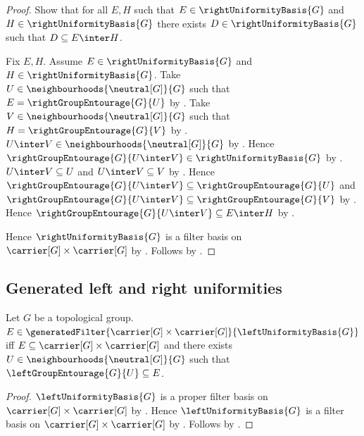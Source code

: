 \begin{proof}
    Show that for all $E,H$ such that
        $E\in\rightUniformityBasis{G}$ and
        $H\in\rightUniformityBasis{G}$ there exists
        $D\in\rightUniformityBasis{G}$ such that
        $D\subseteq E\inter H$.
    \begin{subproof}
        Fix $E,H$.
        Assume $E\in\rightUniformityBasis{G}$ and
            $H\in\rightUniformityBasis{G}$.
        Take $U\in\neighbourhoods{\neutral[G]}{G}$ such that
            $E=\rightGroupEntourage{G}{U}$
            by .
        Take $V\in\neighbourhoods{\neutral[G]}{G}$ such that
            $H=\rightGroupEntourage{G}{V}$
            by .
        $U\inter V\in\neighbourhoods{\neutral[G]}{G}$
            by .
        Hence $\rightGroupEntourage{G}{U\inter V}
            \in\rightUniformityBasis{G}$
            by .
        $U\inter V\subseteq U$ and $U\inter V\subseteq V$
            by .
        Hence $\rightGroupEntourage{G}{U\inter V}
                \subseteq\rightGroupEntourage{G}{U}$ and
            $\rightGroupEntourage{G}{U\inter V}
                \subseteq\rightGroupEntourage{G}{V}$
            by .
        Hence $\rightGroupEntourage{G}{U\inter V}\subseteq E\inter H$
            by .
    \end{subproof}
    Hence $\rightUniformityBasis{G}$ is a filter basis on
        $\carrier[G]\times\carrier[G]$ by .
    Follows by .
\end{proof}

\subsection{Generated left and right uniformities}

\begin{proposition}\label{left_generated_uniformity_iff}
    Let $G$ be a topological group.
    $E\in\generatedFilter
        {\carrier[G]\times\carrier[G]}{\leftUniformityBasis{G}}$ iff
        $E\subseteq\carrier[G]\times\carrier[G]$ and there exists
        $U\in\neighbourhoods{\neutral[G]}{G}$ such that
            $\leftGroupEntourage{G}{U}\subseteq E$.
\end{proposition}
\begin{proof}
    $\leftUniformityBasis{G}$ is a proper filter basis on
        $\carrier[G]\times\carrier[G]$ by
        .
    Hence $\leftUniformityBasis{G}$ is a filter basis on
        $\carrier[G]\times\carrier[G]$ by
        .
    Follows by
        .
\end{proof}

